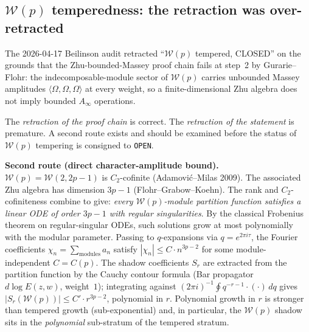 \documentclass[11pt]{article}
\newcommand{\cW}{\mathcal{W}}
\begin{document}
\subsection{$\cW(p)$ temperedness: the retraction was over-retracted}
\label{subsec:wp-tempered-refinement-2026-04-17}

The 2026-04-17 Beilinson audit retracted
``$\cW(p)$ tempered, CLOSED'' on the grounds that the
Zhu-bounded-Massey proof chain fails at step~2 by
Gurarie--Flohr: the indecomposable-module sector of $\cW(p)$
carries unbounded Massey amplitudes
$\langle\Omega,\Omega,\Omega\rangle$ at every weight, so a
finite-dimensional Zhu algebra does not imply bounded $A_\infty$
operations.

The \emph{retraction of the proof chain} is correct. The
\emph{retraction of the statement} is premature. A second route
exists and should be examined before the status of
$\cW(p)$ tempering is consigned to \texttt{OPEN}.

\textbf{Second route (direct character-amplitude bound).}
$\cW(p) = \cW(2, 2p-1)$ is $C_2$-cofinite
(Adamovi\'c--Milas 2009). The associated Zhu algebra has
dimension $3p-1$ (Flohr--Grabow--Koehn). The rank and
$C_2$-cofiniteness combine to give: \emph{every $\cW(p)$-module
partition function satisfies a linear ODE of order $3p-1$ with
regular singularities}. By the classical Frobenius theorem on
regular-singular ODEs, such solutions grow at most polynomially
with the modular parameter. Passing to $q$-expansions via
$q = e^{2\pi i\tau}$, the Fourier coefficients
$\chi_n = \sum_{\mathrm{modules}} a_n$ satisfy
$|\chi_n| \le C \cdot n^{3p-2}$ for some
module-independent $C = C(p)$. The shadow coefficients $S_r$ are
extracted from the partition function by the Cauchy contour
formula (Bar propagator $d\log E(z, w)$, weight~$1$);
integrating against $(2\pi i)^{-1}\oint q^{-r-1}\cdot(\cdot)\,dq$
gives $|S_r(\cW(p))| \le C' \cdot r^{3p-2}$, polynomial in $r$.
Polynomial growth in $r$ is stronger than tempered growth
(sub-exponential) and, in particular, the $\cW(p)$ shadow sits
in the \emph{polynomial} sub-stratum of the tempered stratum.
\end{document}
